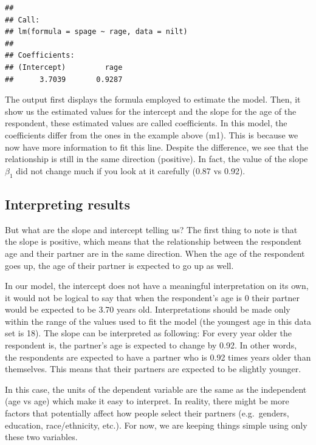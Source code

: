 \documentclass[
]{book}
\begin{document}
\begin{verbatim}
## 
## Call:
## lm(formula = spage ~ rage, data = nilt)
## 
## Coefficients:
## (Intercept)         rage  
##      3.7039       0.9287
\end{verbatim}

The output first displays the formula employed to estimate the model. Then, it show us the estimated values for the intercept and the slope for the age of the respondent, these estimated values are called coefficients. In this model, the coefficients differ from the ones in the example above (m1). This is because we now have more information to fit this line. Despite the difference, we see that the relationship is still in the same direction (positive). In fact, the value of the slope \(\beta_1\) did not change much if you look at it carefully (0.87 vs 0.92).

\hypertarget{interpreting-results}{%
\subsection{Interpreting results}\label{interpreting-results}}

But what are the slope and intercept telling us? The first thing to note is that the slope is positive, which means that the relationship between the respondent age and their partner are in the same direction. When the age of the respondent goes up, the age of their partner is expected to go up as well.

In our model, the intercept does not have a meaningful interpretation on its own, it would not be logical to say that when the respondent's age is 0 their partner would be expected to be 3.70 years old. Interpretations should be made only within the range of the values used to fit the model (the youngest age in this data set is 18). The slope can be interpreted as following: For every year older the respondent is, the partner's age is expected to change by 0.92. In other words, the respondents are expected to have a partner who is 0.92 times years older than themselves. This means that their partners are expected to be slightly younger.

In this case, the units of the dependent variable are the same as the independent (age vs age) which make it easy to interpret. In reality, there might be more factors that potentially affect how people select their partners (e.g.~genders, education, race/ethnicity, etc.). For now, we are keeping things simple using only these two variables.
\end{document}
